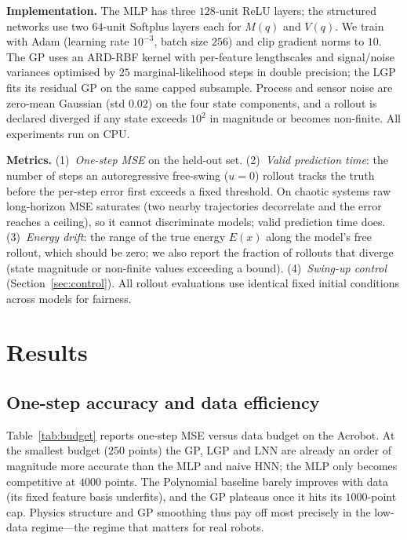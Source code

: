 \documentclass[conference]{IEEEtran}
\begin{document}
\textbf{Implementation.} The MLP has three $128$-unit ReLU layers; the structured
networks use two $64$-unit Softplus layers each for $M(q)$ and $V(q)$. We train
with Adam (learning rate $10^{-3}$, batch size $256$) and clip gradient norms to
$10$. The GP uses an ARD-RBF kernel with per-feature lengthscales and signal/noise
variances optimised by $25$ marginal-likelihood steps in double precision; the LGP
fits its residual GP on the same capped subsample. Process and sensor noise are
zero-mean Gaussian (std $0.02$) on the four state components, and a rollout is
declared diverged if any state exceeds $10^{2}$ in magnitude or becomes
non-finite. All experiments run on CPU.

\textbf{Metrics.} (1)~\emph{One-step MSE} on the held-out set.
(2)~\emph{Valid prediction time}: the number of steps an autoregressive free-swing
($u\!=\!0$) rollout tracks the truth before the per-step error first exceeds a
fixed threshold. On chaotic systems raw long-horizon MSE saturates (two nearby
trajectories decorrelate and the error reaches a ceiling), so it cannot
discriminate models; valid prediction time does. (3)~\emph{Energy drift}: the
range of the true energy $E(x)$ along the model's free rollout, which should be
zero; we also report the fraction of rollouts that diverge (state magnitude or
non-finite values exceeding a bound). (4)~\emph{Swing-up control}
(Section~\ref{sec:control}). All rollout evaluations use identical fixed initial
conditions across models for fairness.

\section{Results}
\subsection{One-step accuracy and data efficiency}
Table~\ref{tab:budget} reports one-step MSE versus data budget on the Acrobot. At
the smallest budget ($250$ points) the GP, LGP and LNN are already an order of
magnitude more accurate than the MLP and naive HNN; the MLP only becomes
competitive at $4000$ points. The Polynomial baseline barely improves with data
(its fixed feature basis underfits), and the GP plateaus once it hits its
$1000$-point cap. Physics structure and GP smoothing thus pay off most precisely
in the low-data regime---the regime that matters for real robots.
\end{document}
